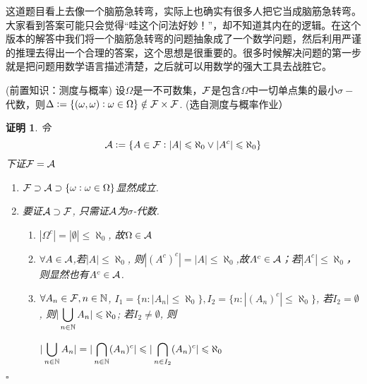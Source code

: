 \documentclass[UTF8, a4paper, 12pt, oneside, twocolumn]{article}
\numberwithin{equation}{section}
\numberwithin{figure}{section}
\numberwithin{table}{section}
\def\dbigcup{\displaystyle\bigcup}	%
\newtheorem*{Proof}{证明}
\newif\ifproof
\newenvironment{Ex}[1][]{\prooffalse \begin{EExercise}{#1}{}}%
{\ifproof%
\hfill\ensuremath{\square}\end{Proof}%
\fi%
\end{EExercise}}
\newcommand{\pr}{\tcblower \begin{Proof}\prooftrue }
\begin{document}
\begin{Remark}{}{}
这道题目看上去像一个脑筋急转弯，实际上也确实有很多人把它当成脑筋急转弯。大家看到答案可能只会觉得“哇这个问法好妙！”，却不知道其内在的逻辑。在这个版本的解答中我们将一个脑筋急转弯的问题抽象成了一个数学问题，然后利用严谨的推理去得出一个合理的答案，这个思想是很重要的。很多时候解决问题的第一步就是把问题用数学语言描述清楚，之后就可以用数学的强大工具去战胜它。
\end{Remark}
\begin{Ex}[(前置知识：测度与概率)]{}
设$\Omega$是一不可数集，$\mathcal{F}$是包含$\Omega$中一切单点集的最小$\sigma-$代数，则$\Delta:=\{(\omega,\omega):\omega \in \Omega\}\notin \mathcal{F}\times\mathcal{F}$.
(选自测度与概率作业）
\pr
令$$\mathcal{A}:=\{A\in\mathcal{F}:|A|\leqslant\aleph_0\vee|A^c|\leqslant\aleph_0\}$$
下证$\mathcal{F}=\mathcal{A}$
\begin{enumerate}
\item $\mathcal{F}\supset\mathcal{A}\supset\{{\omega}:\omega\in\Omega\}$显然成立. 
\item 要证$\mathcal{A}\supset\mathcal{F}$, 只需证$\mathcal{A}$为$\sigma$-代数.
\begin{enumerate}
\item $|\Omega^c|=|\emptyset|\leq\aleph_0$, 故$\Omega\in\mathcal{A}$
\item $\forall A\in\mathcal{A}$,若$|A|\leq\aleph_0$, 则$|(A^c)^c|=|A|\leq\aleph_0$,故$A^c\in\mathcal{A}$；若$|A^c|\leq\aleph_0$，则显然也有$A^c\in\mathcal{A}$. 
\item $\forall A_n\in\mathcal{F}, n\in\mathbb{N}$, $I_1=\{n:|A_n|\leq\aleph_0\},I_2=\{n:|(A_n)^c|\leq\aleph_0\}$, 若$I_2=\emptyset$, 则$|\dbigcup_{n\in\N}A_n|\leq\aleph_0$; 若$I_2\neq\emptyset$, 则
\begin{small}$|\dbigcup_{n\in\N}A_n|=|\bigcap_{n\in\N}(A_n)^c|\leq|\bigcap_{n\in I_2}(A_n)^c|\leq\aleph_0$\end{small}


\end{enumerate}
\end{enumerate}
\end{Ex}
\end{document}
